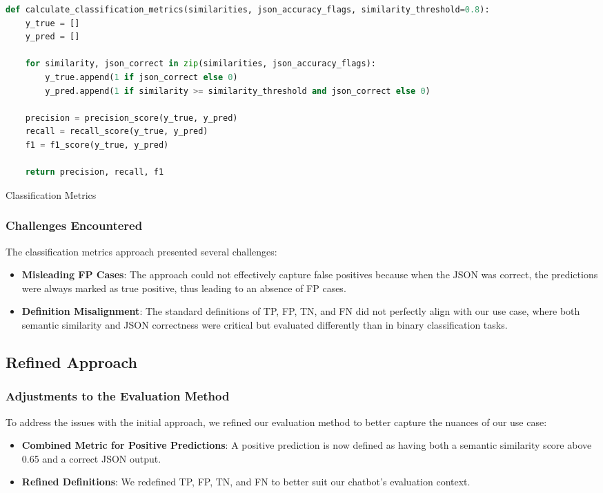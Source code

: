 \begin{Listing}
    \begin{lstlisting}[language=Python]
def calculate_classification_metrics(similarities, json_accuracy_flags, similarity_threshold=0.8):
    y_true = []
    y_pred = []

    for similarity, json_correct in zip(similarities, json_accuracy_flags):
        y_true.append(1 if json_correct else 0)
        y_pred.append(1 if similarity >= similarity_threshold and json_correct else 0)

    precision = precision_score(y_true, y_pred)
    recall = recall_score(y_true, y_pred)
    f1 = f1_score(y_true, y_pred)

    return precision, recall, f1
  \end{lstlisting}
    \caption{Classification Metrics}
    \label{lst:evalMetrics2}
\end{Listing}

\subsubsection{Challenges Encountered}

The classification metrics approach presented several challenges:
\begin{itemize}
    \item \textbf{Misleading FP Cases}: The approach could not effectively capture false positives because when the JSON was correct, the predictions were always marked as true positive, thus leading to an absence of FP cases.
    \item \textbf{Definition Misalignment}: The standard definitions of TP, FP, TN, and FN did not perfectly align with our use case, where both semantic similarity and JSON correctness were critical but evaluated differently than in binary classification tasks.
\end{itemize}

\subsection{Refined Approach}

\subsubsection{Adjustments to the Evaluation Method}

To address the issues with the initial approach, we refined our evaluation method to better capture the nuances of our use case:
\begin{itemize}
    \item \textbf{Combined Metric for Positive Predictions}: A positive prediction is now defined as having both a semantic similarity score above 0.65 and a correct JSON output.
    \item \textbf{Refined Definitions}: We redefined TP, FP, TN, and FN to better suit our chatbot's evaluation context.
\end{itemize}

